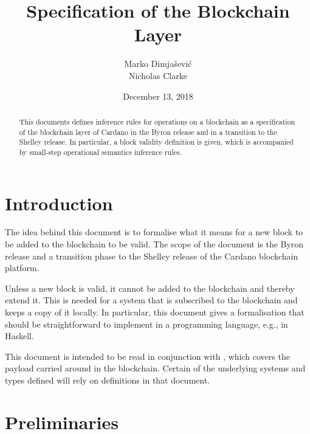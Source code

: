 \documentclass[11pt,a4paper]{article}
\begin{document}
\title{Specification of the Blockchain Layer}

\author{Marko Dimjašević \\ Nicholas Clarke}

\date{December 13, 2018}

\maketitle

\begin{abstract}
  This documents defines inference rules for operations on a blockchain as a
  specification of the blockchain layer of Cardano in the Byron release and in
  a transition to the Shelley release.
  In particular, a block validity definition is given, which is accompanied by
  small-step operational semantics inference rules.
\end{abstract}

\tableofcontents
\listoffigures

\section{Introduction}
\label{sec:introduction}

The idea behind this document is to formalise what it means for a new block to
be added to the blockchain to be valid.
%
The scope of the document is the Byron release and a transition phase to the
Shelley release of the Cardano blockchain platform.


Unless a new block is valid, it cannot be added to the blockchain and thereby
extend it.
%
This is needed for a system that is subscribed to the blockchain and keeps a
copy of it locally.
%
In particular, this document gives a formalisation that should be
straightforward to implement in a programming language, e.g., in Haskell.

This document is intended to be read in conjunction with \cite{byron_ledger_spec},
which covers the payload carried around in the blockchain. Certain of the
underlying systems and types defined will rely on definitions in that document.

\section{Preliminaries}
\label{sec:preliminaries}
\end{document}
